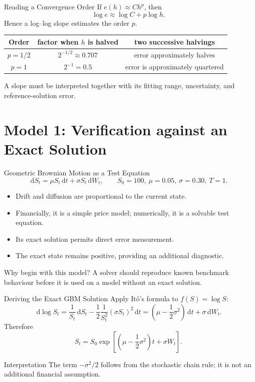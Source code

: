 \documentclass[aspectratio=169,10pt]{beamer}
\newcommand{\dd}{\,\mathrm{d}}
\begin{document}
\begin{frame}{Reading a Convergence Order}
  If $e(h)\approx Ch^p$, then
  \[
    \log e\approx \log C+p\log h.
  \]
  Hence a log--log slope estimates the order $p$.
  \begin{center}
    \begin{tabular}{ccc}
      \toprule
      Order & factor when $h$ is halved & two successive halvings \\
      \midrule
      $p=1/2$ & $2^{-1/2}\approx0.707$ & error approximately halves \\
      $p=1$   & $2^{-1}=0.5$          & error is approximately quartered \\
      \bottomrule
    \end{tabular}
  \end{center}
  \alert{A slope must be interpreted together with its fitting range,
  uncertainty, and reference-solution error.}
\end{frame}

\section{Model 1: Verification against an Exact Solution}

\begin{frame}{Geometric Brownian Motion as a Test Equation}
  \[
    \boxed{\dd S_t=\mu S_t\dd t+\sigma S_t\dd W_t},
    \qquad S_0=100,\ \mu=0.05,\ \sigma=0.30,\ T=1.
  \]
  \begin{itemize}
    \item Drift and diffusion are proportional to the current state.
    \item Financially, it is a simple price model; numerically, it is a solvable test equation.
    \item Its exact solution permits direct error measurement.
    \item The exact state remains positive, providing an additional diagnostic.
  \end{itemize}
  \begin{block}{Why begin with this model?}
    A solver should reproduce known benchmark behaviour before it is used
    on a model without an exact solution.
  \end{block}
\end{frame}

\begin{frame}{Deriving the Exact GBM Solution}
  Apply It\^o's formula to $f(S)=\log S$:
  \[
    \dd\log S_t
    =\frac{1}{S_t}\dd S_t-\frac12\frac{1}{S_t^2}(\sigma S_t)^2\dd t
    =\left(\mu-\frac12\sigma^2\right)\dd t+\sigma\dd W_t.
  \]
  Therefore
  \[
    \boxed{S_t=S_0\exp\!\left[
      \left(\mu-\frac12\sigma^2\right)t+\sigma W_t
    \right]}.
  \]
  \begin{alertblock}{Interpretation}
    The term $-\sigma^2/2$ follows from the stochastic chain rule;
    it is not an additional financial assumption.
  \end{alertblock}
\end{frame}
\end{document}
